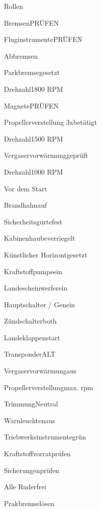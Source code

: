 \begin{task}
  \begin{checklist}{Rollen}
    \item{Bremsen}{PRÜFEN}
    \item{Fluginstrumente}{PRÜFEN}
  \end{checklist}
\end{task}

\begin{task}
  \begin{checklist}{Abbremsen}
    \item{Parkbremse}{gesetzt}
    \item{Drehzahl}{1800 RPM}
    \item{Magnete}{PRÜFEN}
    \item{Propellerverstellung 3x}{betätigt}
    \item{Drehzahl}{1500 RPM}
    \item{Vergaservorwärmung}{geprüft}
    \item{Drehzahl}{1000 RPM}
  \end{checklist}
\end{task}

\begin{task}
  \begin{checklist}{Vor dem Start}
    \item{Brandhahn}{auf}
    \item{Sicherheitsgurte}{fest}
    \item{Kabinenhaube}{verriegelt}
    \item{Künstlicher Horizont}{gesetzt}
    \item{Kraftstoffpumpe}{ein}
    \item{Landescheinwerfer}{ein}
    \item{Hauptschalter / Gen}{ein}
    \item{Zündschalter}{both}
    \item{Landeklappen}{start}
    \item{Transponder}{ALT}
    \item{Vergaservorwärmung}{aus}
    \item{Propellerverstellung}{max. rpm}
    \item{Trimmung}{Neutral}
    \item{Warnleuchten}{aus}
    \item{Triebwerksinstrumente}{grün}
    \item{Kraftstoffvorrat}{prüfen}
    \item{Sicherungen}{prüfen}
    \item{Alle Ruder}{frei}
    \item{Prakbremse}{lösen}
  \end{checklist}
\end{task}

